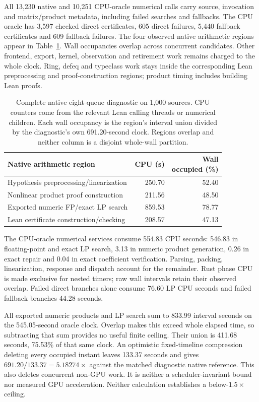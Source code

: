 \documentclass[10pt,twocolumn]{article}
\begin{document}
All 13,230 native and 10,251 CPU-oracle numerical calls carry source,
invocation and matrix/product metadata, including failed searches and
fallbacks. The CPU oracle has 3,597 checked direct certificates, 605 direct
failures, 5,440 fallback certificates and 609 fallback failures.
The four observed native arithmetic regions appear in
Table~\ref{tab:arithmetic-current-stages}. Wall occupancies overlap across
concurrent candidates. Other frontend, export, kernel, observation and
retirement work remains charged to the whole clock. Ring, defeq and
typeclass work stays inside the corresponding Lean preprocessing and
proof-construction regions; product timing includes building Lean proofs.

\begin{table}[t]
\centering
\small
\begin{tabular}{@{}p{}rr@{}}
\toprule
Native arithmetic region & CPU (s) & \shortstack{Wall\\occupied (\%)} \\
\midrule
Hypothesis preprocessing/linearization & 250.70 & 52.40 \\
Nonlinear product proof construction & 211.56 & 48.50 \\
Exported numeric FP/exact LP search & 859.53 & 78.77 \\
Lean certificate construction/checking & 208.57 & 47.13 \\
\bottomrule
\end{tabular}
\caption{Complete native eight-queue diagnostic on 1,000 sources.
CPU counters come from the relevant Lean calling threads or numerical
children. Each wall occupancy is the region's interval union divided by
the diagnostic's own 691.20-second clock.
Regions overlap and neither column is a disjoint whole-wall partition.}
\label{tab:arithmetic-current-stages}
\end{table}

The CPU-oracle numerical services consume 554.83 CPU seconds:
546.83 in floating-point and exact LP search, 3.13 in numeric product
generation, 0.26 in exact repair and 0.04 in exact coefficient verification.
Parsing, packing, linearization, response and dispatch account for the
remainder. Rust phase CPU is made exclusive for nested timers; raw wall
intervals retain their observed overlap.
Failed direct branches alone consume 76.60 LP CPU seconds and failed
fallback branches 44.28 seconds.

All exported numeric products and LP search sum to 833.99 interval seconds
on the 545.05-second oracle clock. Overlap makes this exceed whole elapsed
time, so subtracting that sum provides no useful finite ceiling.
Their union is 411.68 seconds, 75.53\% of that same clock. An optimistic
fixed-timeline compression deleting every occupied instant leaves
133.37 seconds and gives $691.20/133.37=5.18274\times$ against the
matched diagnostic native reference. This also deletes concurrent
non-GPU work. It is neither a scheduler-invariant bound nor measured GPU
acceleration. Neither calculation establishes a below-$1.5\times$ ceiling.
\end{document}

